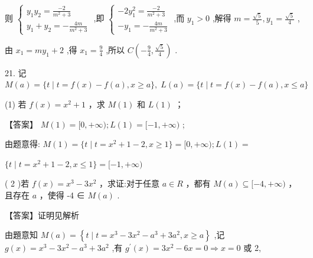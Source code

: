 \documentclass[10pt]{article}
\begin{document}
则 \(\left\{  \begin{array}{l} {y}_{1}{y}_{2} = \frac{-2}{{m}^{2} + 3} \\  {y}_{1} + {y}_{2} =  - \frac{4m}{{m}^{2} + 3} \end{array}\right.\) ,即 \(\left\{  \begin{array}{l}  - 2{y}_{1}^{2} = \frac{-2}{{m}^{2} + 3} \\   - {y}_{1} =  - \frac{4m}{{m}^{2} + 3} \end{array}\right.\) ,而 \({y}_{1} > 0\) ,解得 \(m = \frac{\sqrt{5}}{5},{y}_{1} = \frac{\sqrt{5}}{4}\) ,

由 \({x}_{1} = m{y}_{1} + 2\) ,得 \({x}_{1} = \frac{9}{4}\) ,所以 \(C\left( {-\frac{9}{4},\frac{\sqrt{5}}{4}}\right)\) .

21. 记 \(M\left( a\right)  = \{ t \mid  t = f\left( x\right)  - f\left( a\right) ,x \geq  a\} ,\;L\left( a\right)  = \{ t \mid  t = f\left( x\right)  - f\left( a\right) ,x \leq  a\}\)

(1) 若 \(f\left( x\right)  = {x}^{2} + 1\) ，求 \(M\left( 1\right)\) 和 \(L\left( 1\right)\) ；

【答案】 \(M\left( 1\right)  = \lbrack 0, + \infty );L\left( 1\right)  = \lbrack  - 1, + \infty )\) ;

由题意得: \(M\left( 1\right)  = \{ t \mid  t = {x}^{2} + 1 - 2,x \geq  1\}  = \lbrack 0, + \infty );L\left( 1\right)  =\)

\(\{ t \mid  t = {x}^{2} + 1 - 2,x \leq  1\}  = \lbrack  - 1, + \infty )\)

( 2 )若 \(f\left( x\right)  = {x}^{3} - 3{x}^{2}\) ，求证:对于任意 \(a \in  R\) ，都有 \(M\left( a\right)  \subseteq  \lbrack  - 4, + \infty )\) ，且存在 \(a\) ，使得 -4 ∈ \(M\left( a\right)\) .

【答案】证明见解析

由題意知 \(M\left( a\right)  = \left\{  {t \mid  t = {x}^{3} - 3{x}^{2} - {a}^{3} + 3{a}^{2},x \geq  a}\right\}\) ,记 \(g\left( x\right)  = {x}^{3} - 3{x}^{2} - {a}^{3} + 3{a}^{2}\) ,有 \({g}^{\prime }\left( x\right)  = 3{x}^{2} - {6x} = 0 \Rightarrow  x = 0\) 或 2,

\begin{center}
\end{center}
\end{document}
